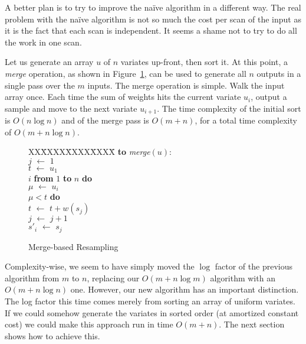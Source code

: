\documentclass[12pt]{article}
\newcommand{\asgn}{\,\,\leftarrow\,\,}
\begin{document}
  A better plan is to try to improve the na\"ive algorithm
  in a different way.  The real problem with the na\"ive
  algorithm is not so much the cost per scan of the input as it is the
  fact that each scan is independent.  It seems a shame not
  to try to do all the work in one scan.

  Let us generate an array $u$ of $n$ variates up-front,
  then sort it.  At this point, a {\em merge} operation, as
  shown in Figure~\ref{fig-merge}, can be used to generate
  all $n$ outputs in a single pass over the $m$ inputs.  The
  merge operation is simple.  Walk the input array once.
  Each time the sum of weights hits the current variate
  $u_i$, output a sample and move to the next variate
  $u_{i+1}$.  The time complexity of the initial sort is
  $O(n \log n)$ and of the merge pass is $O(m + n)$, for a
  total time complexity of $O(m + n \log n)$.

  \begin{figure}
    \centering
    \begin{minipage}{0.6\textwidth}
      \begin{tabbing}
      XX\=XXXX\=XXXX\=XXXX\=\kill
      {\bf to} {\it merge}$(u)$: \\
      \>$j \asgn 1$ \\
      \>$t \asgn u_1$ \\
       $i$ {\bf from} $1$ {\bf to} $n$ {\bf do} \\
      \>\>$\mu \asgn u_i$ \\
      \> $\mu < t$ {\bf do} \\
      \>\>\>$t \asgn t + w(s_j)$ \\
      \>\>\>$j \asgn j + 1$ \\
      \>\>$s'_i \asgn s_j$
    \end{tabbing}
    \end{minipage}
    \caption{Merge-based Resampling}\label{fig-merge}
  \end{figure}

  Complexity-wise, we seem to have simply moved the $\log$
  factor of the previous algorithm from $m$ to $n$,
  replacing our $O(m + n \log m)$ algorithm with an $O(m + n
  \log n)$ one.  However, our new algorithm has an important
  distinction.  The log factor this time comes merely from
  sorting an array of uniform variates.  If we could somehow
  generate the variates in sorted order (at amortized
  constant cost) we could make this approach run in time
  $O(m + n)$.  The next section shows how to achieve this.
\end{document}
